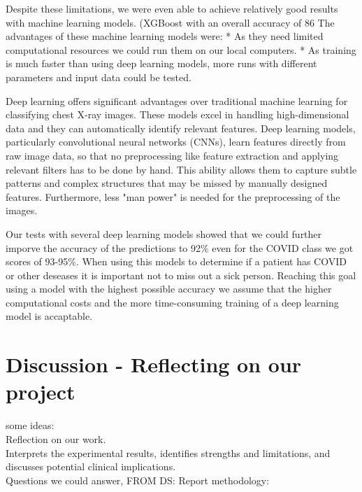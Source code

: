 \documentclass{article}
\begin{document}
Despite these limitations, we were even able to achieve relatively good results with machine learning models. (XGBoost with an overall accuracy of 86%
The advantages of these machine learning models were: 
* As they need limited computational resources we could run them on our local computers.
* As training is much faster than using deep learning models, more runs with different parameters and input data could be tested. 

Deep learning offers significant advantages over traditional machine learning for classifying chest X-ray images. These models excel in handling high-dimensional data and they can automatically identify relevant features. Deep learning models, particularly convolutional neural networks (CNNs), learn features directly from raw image data, so that no preprocessing like feature extraction and applying relevant filters has to be done by hand. This ability allows them to capture subtle patterns and complex structures that may be missed by manually designed features. Furthermore, less "man power" is needed for the preprocessing of the images. 

Our tests with several deep learning models showed that we could further imporve the  accuracy of the predictions to 92\% even for the COVID class we got scores of 93-95\%. When using this models to determine if a patient has COVID or other deseases it is important not to miss out a sick person. Reaching this goal using a model with the highest possible accuracy we assume that the higher computational costs and the more time-consuming training of a deep learning model is accaptable. 




\section{Discussion - Reflecting on our project}

some ideas: \\
Reflection on our work. \\
Interprets the experimental results, identifies strengths and limitations, and discusses potential clinical implications.\\

Questions we could answer, FROM DS: Report methodology:\\
\end{document}
